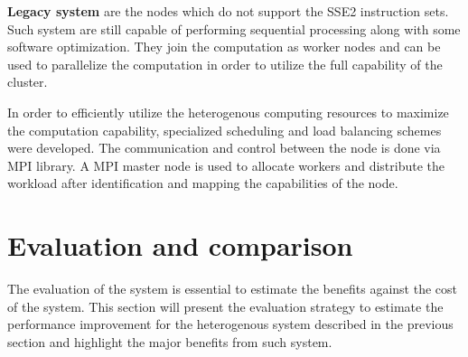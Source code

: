 \documentclass[12pt,twoside]{article}
\begin{document}
\textbf{Legacy system} are the nodes which do not support the SSE2 instruction sets. Such system are still capable of performing
sequential processing along with some software optimization. They join the computation as worker nodes and can be used to parallelize
the computation in order to utilize the full capability of the cluster.

In order to efficiently utilize the heterogenous computing resources to maximize the computation capability,
specialized scheduling and load balancing schemes were developed. The communication and control between the node is done via MPI library.
A MPI master node is used to allocate workers and distribute the workload after identification and mapping the capabilities of the node.

\section{Evaluation and comparison}
\label{sec:eval}

The evaluation of the system is essential to estimate the benefits against the cost of the system. This section will present the evaluation
strategy to estimate the performance improvement for the heterogenous system described in the previous section and highlight the major
benefits from such system.
\end{document}
